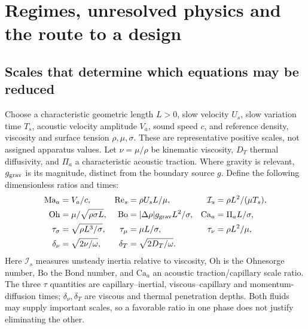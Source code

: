 \section{Regimes, unresolved physics and the route to a design}\label{sec:validity}

\subsection{Scales that determine which equations may be reduced}
Choose a characteristic geometric length $L>0$, slow velocity $U_s$, slow
variation time $T_s$, acoustic velocity amplitude $V_a$, sound speed $c$, and
reference density, viscosity and surface tension $\rho,\mu,\sigma$. These are
representative positive scales, not assigned apparatus values. Let
$\nu=\mu/\rho$ be kinematic viscosity, $D_T$ thermal diffusivity, and
$\Pi_a$ a characteristic acoustic traction. Where gravity is relevant,
$g_{\rm grav}$ is its magnitude, distinct from the boundary source $g$.
Define the following dimensionless ratios and times:
\begin{align}
 \mathrm{Ma}_a&=V_a/c, &
 \mathrm{Re}_s&=\rho U_sL/\mu, &
 \mathcal I_s&=\rho L^2/(\mu T_s),\label{eq:scale-ratios-a}\\
 \mathrm{Oh}&=\mu/\sqrt{\rho\sigma L}, &
 \mathrm{Bo}&=|\Delta\rho|g_{\rm grav}L^2/\sigma, &
 \mathrm{Ca}_a&=\Pi_aL/\sigma,\label{eq:scale-ratios-b}\\
 \tau_\sigma&=\sqrt{\rho L^3/\sigma}, &
 \tau_\mu&=\mu L/\sigma, &
 \tau_\nu&=\rho L^2/\mu,\label{eq:scale-times}\\
 \delta_\nu&=\sqrt{2\nu/\omega}, &
 \delta_T&=\sqrt{2D_T/\omega}.&&\label{eq:boundary-layer-scales}
\end{align}
Here $\mathcal I_s$ measures unsteady inertia relative to viscosity,
$\mathrm{Oh}$ is the Ohnesorge number, $\mathrm{Bo}$ the Bond number, and
$\mathrm{Ca}_a$ an acoustic traction/capillary scale ratio. The three $\tau$
quantities are capillary--inertial, viscous--capillary and momentum-diffusion
times; $\delta_\nu,\delta_T$ are viscous and thermal penetration depths.
Both fluids may supply important scales, so a favorable ratio in one phase
does not justify eliminating the other.

